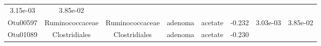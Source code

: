 \documentclass[11pt,]{article}
\begin{document}
\begin{longtable}[]{@{}cccccccc@{}}
\begin{minipage}[t]{0.08\columnwidth}
3.15e-03\strut
\end{minipage} & \begin{minipage}[t]{0.08\columnwidth}\centering\strut
3.85e-02\strut
\end{minipage}\tabularnewline
\begin{minipage}[t]{0.08\columnwidth}\centering\strut
Otu00597\strut
\end{minipage} & \begin{minipage}[t]{0.15\columnwidth}\centering\strut
Ruminococcaceae\strut
\end{minipage} & \begin{minipage}[t]{0.15\columnwidth}\centering\strut
Ruminococcaceae\strut
\end{minipage} & \begin{minipage}[t]{0.08\columnwidth}\centering\strut
adenoma\strut
\end{minipage} & \begin{minipage}[t]{0.09\columnwidth}\centering\strut
acetate\strut
\end{minipage} & \begin{minipage}[t]{0.07\columnwidth}\centering\strut
-0.232\strut
\end{minipage} & \begin{minipage}[t]{0.08\columnwidth}\centering\strut
3.03e-03\strut
\end{minipage} & \begin{minipage}[t]{0.08\columnwidth}\centering\strut
3.85e-02\strut
\end{minipage}\tabularnewline
\begin{minipage}[t]{0.08\columnwidth}\centering\strut
Otu01089\strut
\end{minipage} & \begin{minipage}[t]{0.15\columnwidth}\centering\strut
Clostridiales\strut
\end{minipage} & \begin{minipage}[t]{0.15\columnwidth}\centering\strut
Clostridiales\strut
\end{minipage} & \begin{minipage}[t]{0.08\columnwidth}\centering\strut
adenoma\strut
\end{minipage} & \begin{minipage}[t]{0.09\columnwidth}\centering\strut
acetate\strut
\end{minipage} & \begin{minipage}[t]{0.07\columnwidth}\centering\strut
-0.230\strut
\end{minipage} & \begin{minipage}[t]{0.08\columnwidth}\centering\strut

\end{minipage}
\end{longtable}
\end{document}
